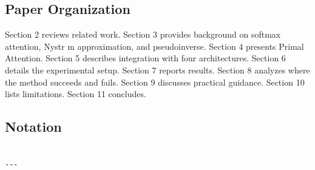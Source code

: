 \subsection{Paper Organization}

Section 2 reviews related work. Section 3 provides background on softmax 
attention, Nystr m approximation, and pseudoinverse. Section 4 presents 
Primal Attention. Section 5 describes integration with four architectures. 
Section 6 details the experimental setup. Section 7 reports results. Section 
8 analyzes where the method succeeds and fails. Section 9 discusses practical 
guidance. Section 10 lists limitations. Section 11 concludes.



\subsection{Notation}

\begin{lstlisting}

---
\end{lstlisting}